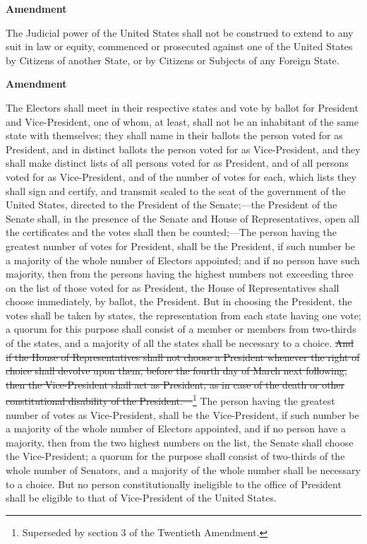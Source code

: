 \documentclass[12pt]{article}
\title{\caps{Amendments to the Constitution of the United States}}
\author{}
\date{}
\newcounter{amendment}
\newenvironment{amendment}
{\stepcounter{amendment}\setcounter{sect}{0}\begin{center}
{\bf Amendment~\Roman{amendment}}
\end{center}}
{}
\newcounter{sect}[amendment]
\newcommand{\fn}[1]{\footnote{#1}}
\begin{document}
\maketitle

\begin{amendment}
The Judicial power of the United States shall not be construed to extend to any suit in law or equity, commenced or prosecuted against one of the United States by Citizens of another State, or by Citizens or Subjects of any Foreign State.
\end{amendment}

\begin{amendment}
The Electors shall meet in their respective states and vote by ballot for President and Vice-President, one of whom, at least, shall not be an inhabitant of the same state with themselves; they shall name in their ballots the person voted for as President, and in distinct ballots the person voted for as Vice-President, and they shall make distinct lists of all persons voted for as President, and of all persons voted for as Vice-President, and of the number of votes for each, which lists they shall sign and certify, and transmit sealed to the seat of the government of the United States, directed to the President of the Senate;---the President of the Senate shall, in the presence of the Senate and House of Representatives, open all the certificates and the votes shall then be counted;---The person having the greatest number of votes for President, shall be the President, if such number be a majority of the whole number of Electors appointed; and if no person have such majority, then from the persons having the highest numbers not exceeding three on the list of those voted for as President, the House of Representatives shall choose immediately, by ballot, the President. But in choosing the President, the votes shall be taken by states, the representation from each state having one vote; a quorum for this purpose shall consist of a member or members from two-thirds of the states, and a majority of all the states shall be necessary to a choice. \st{And if the House of Representatives shall not choose a President whenever the right of choice shall devolve upon them, before the fourth day of March next following, then the Vice-President shall act as President, as in case of the death or other constitutional disability of the President.---}\fn{Superseded by section 3 of the Twentieth Amendment.} The person having the greatest number of votes as Vice-President, shall be the Vice-President, if such number be a majority of the whole number of Electors appointed, and if no person have a majority, then from the two highest numbers on the list, the Senate shall choose the Vice-President; a quorum for the purpose shall consist of two-thirds of the whole number of Senators, and a majority of the whole number shall be necessary to a choice. But no person constitutionally ineligible to the office of President shall be eligible to that of Vice-President of the United States.
\end{amendment}
\end{document}
